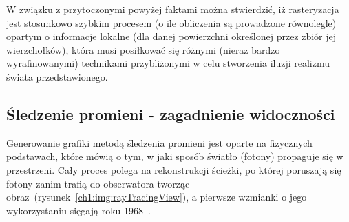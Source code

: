 W związku z przytoczonymi powyżej faktami można stwierdzić, iż rasteryzacja jest stosunkowo szybkim procesem (o ile obliczenia są prowadzone równolegle) opartym o informacje lokalne (dla danej powierzchni określonej przez zbiór jej wierzchołków), która musi posiłkować się różnymi (nieraz bardzo wyrafinowanymi) technikami przybliżonymi w celu stworzenia iluzji realizmu świata przedstawionego.

\subsection{Śledzenie promieni - zagadnienie widoczności}
Generowanie grafiki metodą śledzenia promieni jest oparte na fizycznych podstawach, które mówią o tym, w jaki sposób światło (fotony) propaguje się w przestrzeni. Cały proces polega na rekonstrukcji ścieżki, po której poruszają się fotony zanim trafią do obserwatora tworząc obraz~(rysunek~\ref{ch1:img:rayTracingView}), a pierwsze wzmianki o jego wykorzystaniu sięgają roku 1968~\cite{APPEL1968}.

